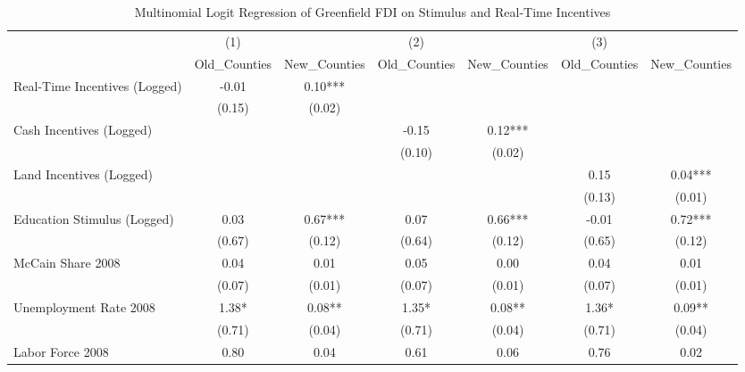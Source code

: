 \begin{table}[!htbp]\centering
\def\sym#1{\ifmmode^{#1}\else\(^{#1}\)\fi}
\caption{Multinomial Logit Regression of Greenfield FDI on Stimulus and Real-Time Incentives}
\begin{tabular}{l*{6}{c}}
\hline\hline
                    &         (1)   &               &         (2)   &               &         (3)   &               \\
                    &Old_Counties   &New_Counties   &Old_Counties   &New_Counties   &Old_Counties   &New_Counties   \\
\hline
Real-Time Incentives (Logged)&       -0.01   &        0.10***&               &               &               &               \\
                    &      (0.15)   &      (0.02)   &               &               &               &               \\
Cash Incentives (Logged)&               &               &       -0.15   &        0.12***&               &               \\
                    &               &               &      (0.10)   &      (0.02)   &               &               \\
Land Incentives (Logged)&               &               &               &               &        0.15   &        0.04***\\
                    &               &               &               &               &      (0.13)   &      (0.01)   \\
Education Stimulus (Logged)&        0.03   &        0.67***&        0.07   &        0.66***&       -0.01   &        0.72***\\
                    &      (0.67)   &      (0.12)   &      (0.64)   &      (0.12)   &      (0.65)   &      (0.12)   \\
McCain Share 2008   &        0.04   &        0.01   &        0.05   &        0.00   &        0.04   &        0.01   \\
                    &      (0.07)   &      (0.01)   &      (0.07)   &      (0.01)   &      (0.07)   &      (0.01)   \\
Unemployment Rate 2008 &        1.38*  &        0.08** &        1.35*  &        0.08** &        1.36*  &        0.09** \\
                    &      (0.71)   &      (0.04)   &      (0.71)   &      (0.04)   &      (0.71)   &      (0.04)   \\
Labor Force 2008    &        0.80   &        0.04   &        0.61   &        0.06   &        0.76   &        0.02   \\

\end{tabular}
\end{table}
